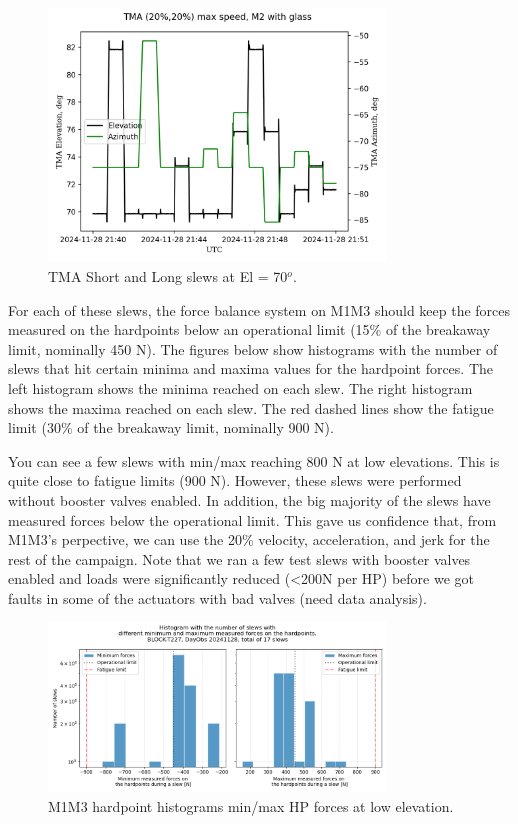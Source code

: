 \begin{figure}
    \centering
    \includegraphics[width=0.8\textwidth]{spa/20_vel_acc_jerk/BLOCK-T293_azel_slews.png}
    \caption{TMA Short and Long slews at El = 70$^o$.}
    \label{fig:block293_azel_slews}
    \end{figure}


For each of these slews, the force balance system on M1M3 should keep the forces
measured on the hardpoints below an operational limit (15\% of the breakaway limit, nominally 450 N).
The figures below show histograms with the number of slews that hit certain minima
and maxima values for the hardpoint forces. The left histogram shows the minima
reached on each slew. The right histogram shows the maxima reached on each slew.
The red dashed lines show the fatigue limit (30\% of the breakaway limit, nominally 900 N).

You can see a few slews with min/max reaching 800 N at low elevations.
This is quite close to fatigue limits (900 N).
However, these slews were performed without booster valves enabled.
In addition, the big majority of the slews have measured forces below the operational limit.
This gave us confidence that, from M1M3's perpective, we can use the 20\% velocity, acceleration, and jerk for the rest of the campaign.
Note that we ran a few test slews with booster valves enabled and loads were significantly reduced (<200N per HP) before we got faults in some of the actuators with bad valves (need data analysis).

\begin{figure}
    \centering
    \includegraphics[width=0.8\textwidth]{spa/20_vel_acc_jerk/BLOCK-T227_m1m3_hp_histograms.png}
    \caption{M1M3 hardpoint histograms min/max HP forces at low elevation.}
    \label{fig:block227_m1m3_hp_histograms}
    \end{figure}

